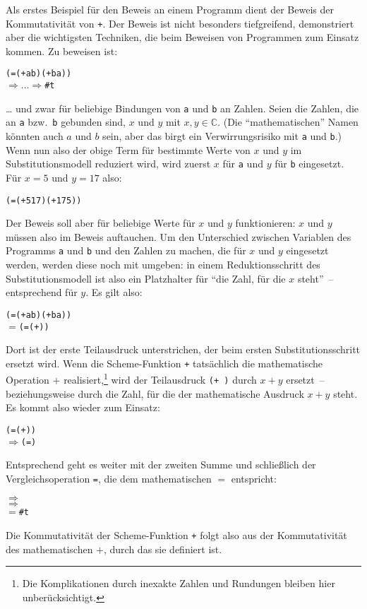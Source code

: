 Als erstes Beispiel für den Beweis an einem Programm dient der Beweis
der Kommutativität von \texttt{+}.  Der Beweis ist nicht besonders
tiefgreifend, demonstriert aber die wichtigsten Techniken, die beim
Beweisen von Programmen zum Einsatz kommen.  Zu beweisen ist:
%
\begin{alltt}
(= (+ a b) (+ b a))
\(\Longrightarrow\ldots\Longrightarrow\) \#t
\end{alltt}
%
\ldots{} und zwar für beliebige Bindungen von \texttt{a} und
\texttt{b} an Zahlen.  Seien die Zahlen, die an \texttt{a} bzw.\
\texttt{b} gebunden sind, $x$ und $y$ mit $x,y\in\mathbb{C}$.  (Die
"`mathematischen"' Namen könnten auch $a$ und $b$ sein, aber das birgt
ein Verwirrungsrisiko mit \texttt{a} und \texttt{b}.)  Wenn nun also
der obige Term für bestimmte Werte von $x$ und $y$ im
Substitutionsmodell reduziert wird, wird zuerst $x$ für \texttt{a} und
$y$ für \texttt{b} eingesetzt.  Für $x=5$ und $y=17$ also:
%
\begin{alltt}
(= (+ 5 17) (+ 17 5))
\end{alltt}
%
Der Beweis soll aber für beliebige Werte für $x$ und $y$
funktionieren: $x$ und $y$ müssen also im Beweis auftauchen.
Um den Unterschied zwischen Variablen des Programms \texttt{a} und
\texttt{b} und den Zahlen zu machen, die für $x$ und $y$ eingesetzt
werden, werden diese noch mit \valof{\_} umgeben: \valof{x} in
einem Reduktionsschritt des Substitutionsmodell ist also ein
Platzhalter für "`die Zahl, für die $x$ steht"'~-- entsprechend für $y$.
Es gilt also:

\begin{alltt}
(= (+ a b) (+ b a))
\(=\) (=  (+  ))
\end{alltt}
%
Dort ist der erste Teilausdruck unterstrichen, der beim ersten
Substitutionsschritt ersetzt wird.  Wenn die Scheme-Funktion
\texttt{+} tatsächlich die mathematische Operation $+$
realisiert,\footnote{Die Komplikationen durch inexakte Zahlen und
  Rundungen bleiben hier unberücksichtigt.}
wird der Teilausdruck \texttt{(+  )} durch $x+y$
ersetzt~-- beziehungsweise durch die Zahl, für die der mathematische
Ausdruck $x+y$ steht.  Es kommt also wieder \valof{\_} zum Einsatz:
%
\begin{alltt}
(=  (+  ))
\(\Longrightarrow\) (=  )
\end{alltt}
%
Entsprechend geht es weiter mit der zweiten Summe und schließlich der
Vergleichsoperation \texttt{=}, die dem mathematischen $=$ entspricht:
%
\begin{alltt}
\(\Longrightarrow\) 
\(\Longrightarrow\) 
\(=\) \#t
\end{alltt}
%
Die Kommutativität der Scheme-Funktion \texttt{+} folgt also aus der
Kommutativität des mathematischen $+$, durch das sie definiert ist.

